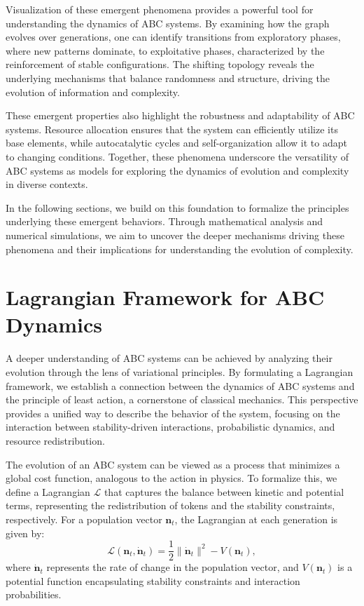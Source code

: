 \documentclass[%
 preprint, linenumbers,
 amsmath,amssymb,
 aps, physrev,
]{revtex4-2}
\begin{document}
Visualization of these emergent phenomena provides a powerful tool for understanding the dynamics of ABC systems. By examining how the graph evolves over generations, one can identify transitions from exploratory phases, where new patterns dominate, to exploitative phases, characterized by the reinforcement of stable configurations. The shifting topology reveals the underlying mechanisms that balance randomness and structure, driving the evolution of information and complexity.

These emergent properties also highlight the robustness and adaptability of ABC systems. Resource allocation ensures that the system can efficiently utilize its base elements, while autocatalytic cycles and self-organization allow it to adapt to changing conditions. Together, these phenomena underscore the versatility of ABC systems as models for exploring the dynamics of evolution and complexity in diverse contexts.

In the following sections, we build on this foundation to formalize the principles underlying these emergent behaviors. Through mathematical analysis and numerical simulations, we aim to uncover the deeper mechanisms driving these phenomena and their implications for understanding the evolution of complexity.

\section{Lagrangian Framework for ABC Dynamics}

A deeper understanding of ABC systems can be achieved by analyzing their evolution through the lens of variational principles. By formulating a Lagrangian framework, we establish a connection between the dynamics of ABC systems and the principle of least action, a cornerstone of classical mechanics. This perspective provides a unified way to describe the behavior of the system, focusing on the interaction between stability-driven interactions, probabilistic dynamics, and resource redistribution.

The evolution of an ABC system can be viewed as a process that minimizes a global cost function, analogous to the action in physics. To formalize this, we define a Lagrangian $\mathcal{L}$ that captures the balance between kinetic and potential terms, representing the redistribution of tokens and the stability constraints, respectively. For a population vector $\mathbf{n}_t$, the Lagrangian at each generation is given by:
\begin{equation}
\mathcal{L}(\mathbf{n}_t, \dot{\mathbf{n}}_t) = \frac{1}{2} \|\dot{\mathbf{n}}_t\|^2 - V(\mathbf{n}_t),
\end{equation}
where $\dot{\mathbf{n}}_t$ represents the rate of change in the population vector, and $V(\mathbf{n}_t)$ is a potential function encapsulating stability constraints and interaction probabilities.
\end{document}
